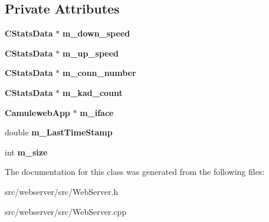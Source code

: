 \subsection*{Private Attributes}
\begin{DoxyCompactItemize}
\item 
{\bf CStatsData} $\ast$ {\bfseries m\_\-down\_\-speed}\label{classCStatsCollection_a67ac1c2e447ec7a2c0ed24688b722949}

\item 
{\bf CStatsData} $\ast$ {\bfseries m\_\-up\_\-speed}\label{classCStatsCollection_aedca775842fc7fade16dfbb46a46e198}

\item 
{\bf CStatsData} $\ast$ {\bfseries m\_\-conn\_\-number}\label{classCStatsCollection_a1de535fd092b3f7a63b1267d0db9d00e}

\item 
{\bf CStatsData} $\ast$ {\bfseries m\_\-kad\_\-count}\label{classCStatsCollection_af0629640fced5e1ace705a4bfe533b83}

\item 
{\bf CamulewebApp} $\ast$ {\bfseries m\_\-iface}\label{classCStatsCollection_a0d6cd0d41aadddfba36535901035de9a}

\item 
double {\bfseries m\_\-LastTimeStamp}\label{classCStatsCollection_ae45062845534157373f9a414bcf50f3c}

\item 
int {\bfseries m\_\-size}\label{classCStatsCollection_a7cf644ae845bbffdb2b879762c912340}

\end{DoxyCompactItemize}


The documentation for this class was generated from the following files:\begin{DoxyCompactItemize}
\item 
src/webserver/src/WebServer.h\item 
src/webserver/src/WebServer.cpp\end{DoxyCompactItemize}

